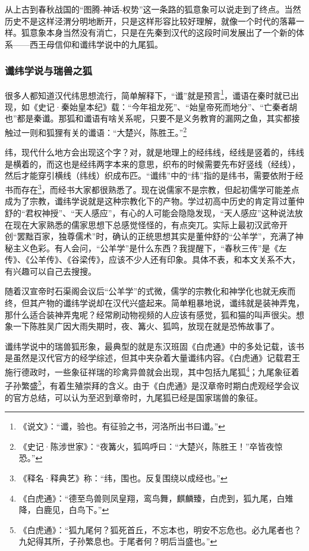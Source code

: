 \documentclass[UTF8, 12pt, A4paper]{article}
\begin{document}
从上古到春秋战国的“图腾-神话-权势”这一条路的狐意象可以说走到了终点。当然历史不是这样泾渭分明地断开，只是这样形容比较好理解，就像一个时代的落幕一样。狐意象本身当然没有消亡，只是在先秦到汉代的这段时间发展出了一个新的体系——西王母信仰和谶纬学说中的九尾狐。

\subsubsection{谶纬学说与瑞兽之狐}

很多人都知道汉代纬思想流行，简单解释下，“谶”就是预言\footnote{《说文》：“谶，验也。有征验之书，河洛所出书曰谶。”}，谶语在秦时就已出现，如《史记·秦始皇本纪》载：“今年祖龙死”、“始皇帝死而地分”、“亡秦者胡也”都是秦谶。那狐和谶语有啥关系呢，只要不是义务教育的漏网之鱼，其实都接触过一则和狐狸有关的谶语：“大楚兴，陈胜王。”\footnote{《史记·陈涉世家》：“夜篝火，狐鸣呼曰：“大楚兴，陈胜王！”卒皆夜惊恐。”}

纬，现代什么地方会出现这个字？对，就是地理上的经纬线，经线是竖着的，纬线是横着的，而这也是经纬两字本来的意思，织布的时候需要先布好竖线（经线），然后才能穿引横线（纬线）织成布匹。“谶纬”中的“纬”指的是纬书，需要依附于经书而存在\footnote{《释名·释典艺》称：“纬，围也。反复围绕以成经也。”}，而经书大家都很熟悉了。现在说儒家不是宗教，但起初儒学可能差点成为了宗教，谶纬学说就是这种宗教化下的产物。学过初高中历史的肯定背过董仲舒的“君权神授”、“天人感应”，有心的人可能会隐隐发现，“天人感应”这种说法放在现在大家熟悉的儒家思想下总感觉怪怪的，有点突兀。实际上最初汉武帝开创“罢黜百家，独尊儒术”时，确认的正统思想其实是董仲舒的“公羊学”，充满了神秘主义色彩。有人会问，“公羊学”是什么东西？我提醒下，“春秋三传”是《左传》、《公羊传》、《谷梁传》，应该不少人还有印象。具体不表，和本文关系不大，有兴趣可以自己去搜搜。

随着汉宣帝时石渠阁会议后“公羊学”的式微，儒学的宗教化和神学化也就无疾而终，但其产物的谶纬学说却在汉代兴盛起来。简单粗暴地说，谶纬就是装神弄鬼，那什么适合装神弄鬼呢？经常刷动物视频的人应该有感觉，狐和猫的叫声很尖。想象一下陈胜吴广因大雨失期时，夜、篝火、狐鸣，放现在就是恐怖故事了。

谶纬学说中的瑞兽狐形象，最典型的就是东汉班固《白虎通》中的多处记载，该书是虽然是汉代官方的经学综述，但其中夹杂着大量谶纬内容。《白虎通》记载君王施行德政时，一些象征祥瑞的珍禽异兽就会出现，其中包括九尾狐\footnote{《白虎通》：“德至鸟兽则凤皇翔，鸾鸟舞，麒麟臻，白虎到，狐九尾，白雉降，白鹿见，白鸟下。”}；九尾象征着子孙繁盛\footnote{《白虎通》：“狐九尾何？狐死首丘，不忘本也，明安不忘危也。必九尾者也？九妃得其所，子孙繁息也。于尾者何？明后当盛也。”}，有着生殖崇拜的含义。由于《白虎通》是汉章帝时期白虎观经学会议的官方总结，可以认为至迟到章帝时，九尾狐已经是国家瑞兽的象征。
\end{document}

